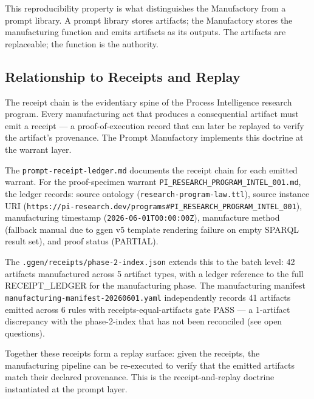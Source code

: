 This reproducibility property is what distinguishes the Manufactory from a prompt
library. A prompt library stores artifacts; the Manufactory stores the manufacturing
function and emits artifacts as its outputs. The artifacts are replaceable; the function
is the authority.

\subsection{Relationship to Receipts and Replay}
\label{sec:research-prompt-manufactory-lineage-receipts}

The receipt chain is the evidentiary spine of the Process Intelligence research program.
Every manufacturing act that produces a consequential artifact must emit a receipt ---
a proof-of-execution record that can later be replayed to verify the artifact's
provenance. The Prompt Manufactory implements this doctrine at the warrant layer.

The \texttt{prompt-receipt-ledger.md} documents the receipt chain for each emitted
warrant. For the proof-specimen warrant
\texttt{PI\_RESEARCH\_PROGRAM\_INTEL\_001.md}, the ledger records: source ontology
(\texttt{research-program-law.ttl}), source instance URI
(\texttt{https://pi-research.dev/programs\#PI\_RESEARCH\_PROGRAM\_INTEL\_001}),
manufacturing timestamp (\texttt{2026-06-01T00:00:00Z}), manufacture method (fallback
manual due to ggen v5 template rendering failure on empty SPARQL result set), and
proof status (PARTIAL).

The \texttt{.ggen/receipts/phase-2-index.json} extends this to the batch level:
42 artifacts manufactured across 5 artifact types, with a ledger reference to
the full RECEIPT\_LEDGER for the manufacturing phase. The manufacturing manifest
\texttt{manufacturing-manifest-20260601.yaml} independently records 41 artifacts
emitted across 6 rules with receipts-equal-artifacts gate PASS --- a 1-artifact
discrepancy with the phase-2-index that has not been reconciled (see open questions).

Together these receipts form a replay surface: given the receipts, the manufacturing
pipeline can be re-executed to verify that the emitted artifacts match their declared
provenance. This is the receipt-and-replay doctrine instantiated at the prompt layer.
